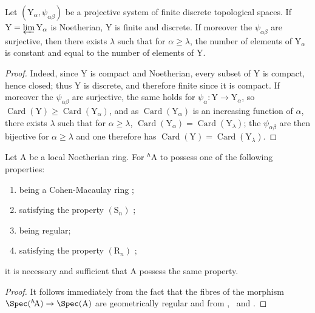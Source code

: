 \begin{lemma}[18.6.9.2]
\label{IV.18.6.9.2}
Let $(\mathrm{Y}_\alpha,\psi_{\alpha\beta})$ be a projective system of finite discrete topological spaces.
If $\mathrm{Y}=\varprojlim\mathrm{Y}_\alpha$ is Noetherian, Y is finite and discrete.
If moreover the $\psi_{\alpha\beta}$ are surjective, then there exists $\lambda$ such that for $\alpha\geq\lambda$, the number of elements of $\mathrm{Y}_\alpha$ is constant and equal to the number of elements of $\mathrm{Y}$.
\end{lemma}

\begin{proof}
Indeed, since Y is compact and Noetherian, every subset of Y is compact, hence closed; thus Y is discrete, and therefore finite since it is compact.
If moreover the $\psi_{\alpha\beta}$ are surjective, the same holds for $\psi_\alpha:\mathrm{Y}\to\mathrm{Y}_\alpha$, so $\operatorname{Card}(\mathrm{Y})\geq\operatorname{Card}(\mathrm{Y}_\alpha)$, and as $\operatorname{Card}(\mathrm{Y}_\alpha)$ is an increasing function of $\alpha$, there exists $\lambda$ such that for $\alpha\geq\lambda$, $\operatorname{Card}(\mathrm{Y}_\alpha)=\operatorname{Card}(\mathrm{Y}_\lambda)$;
the $\psi_{\alpha\beta}$ are then bijective for $\alpha\geq\lambda$ and one therefore has $\operatorname{Card}(\mathrm{Y})=\operatorname{Card}(\mathrm{Y}_\lambda)$.
\end{proof}

\begin{corollary}[18.6.10]
\label{IV.18.6.10}
Let $\mathrm{A}$ be a local Noetherian ring.
For ${}^h\!\mathrm{A}$ to possess one of the following properties:
\begin{enumerate}[label=\emph{\alph*)}]
  \item being a Cohen-Macaulay ring ;
  \item satisfying the property $(\mathrm{S}_n)$ ;
  \item being regular;
  \item satisfying the property $(\mathrm{R}_n)$ ;
\end{enumerate}
it is necessary and sufficient that A possess the same property.
\end{corollary}

\begin{proof}
It follows immediately from the fact that the fibres of the morphism $\Spec({}^h\!\mathrm{A})\to\Spec(\mathrm{A})$ are geometrically regular  and from ,~ and .
\end{proof}

